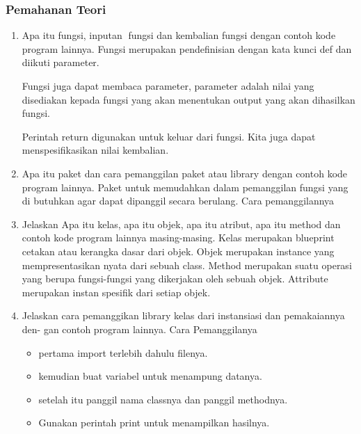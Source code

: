 \subsubsection{Pemahanan Teori}
\begin{enumerate}
    \item Apa itu fungsi, inputan fungsi dan kembalian fungsi dengan contoh kode program
    lainnya.
    Fungsi merupakan pendefinisian dengan kata kunci def dan diikuti parameter.
    

    Fungsi juga dapat membaca parameter, parameter adalah nilai yang disediakan kepada fungsi yang akan menentukan output yang akan dihasilkan fungsi.
    

    Perintah return digunakan untuk keluar dari fungsi. Kita juga dapat menspesifikasikan nilai kembalian.
    

    \item Apa itu paket dan cara pemanggilan paket atau library dengan contoh kode
    program lainnya.
    Paket untuk memudahkan dalam pemanggilan fungsi yang di butuhkan agar dapat dipanggil secara berulang.
    Cara pemanggilannya
    

    \item Jelaskan Apa itu kelas, apa itu objek, apa itu atribut, apa itu method dan
    contoh kode program lainnya masing-masing.
    Kelas merupakan blueprint cetakan atau kerangka dasar dari objek.
    Objek merupakan instance yang mempresentasikan nyata dari sebuah class.
    Method merupakan suatu operasi yang berupa fungsi-fungsi yang dikerjakan oleh sebuah objek.
    Attribute merupakan instan spesifik dari setiap objek.
    

    \item Jelaskan cara pemanggikan library kelas dari instansiasi dan pemakaiannya den-
    gan contoh program lainnya.
    Cara Pemanggilanya
    \begin{itemize}
        \item pertama import terlebih dahulu filenya.
        \item kemudian buat variabel untuk menampung datanya.
        \item setelah itu panggil nama classnya dan panggil methodnya.
        \item Gunakan perintah print untuk menampilkan hasilnya.


\end{itemize}
\end{enumerate}

